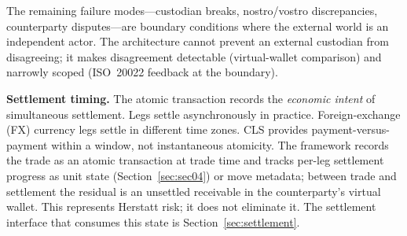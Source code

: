 The remaining failure modes---custodian breaks, nostro/vostro discrepancies, counterparty disputes---are boundary conditions where the external world is an independent actor. The architecture cannot prevent an external custodian from disagreeing; it makes disagreement detectable (virtual-wallet comparison) and narrowly scoped (ISO~20022 feedback at the boundary).

\noindent\textbf{Settlement timing.} The atomic transaction records the \emph{economic intent} of simultaneous settlement. Legs settle asynchronously in practice. Foreign-exchange (FX) currency legs settle in different time zones. CLS provides payment-versus-payment within a window, not instantaneous atomicity. The framework records the trade as an atomic transaction at trade time and tracks per-leg settlement progress as unit state (Section~\ref{sec:sec04}) or move metadata; between trade and settlement the residual is an unsettled receivable in the counterparty's virtual wallet. This represents Herstatt risk; it does not eliminate it. The settlement interface that consumes this state is Section~\ref{sec:settlement}.

\clearpage
